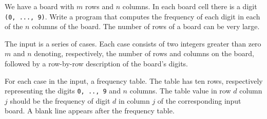 

\Statement

We have a board with $m$ rows and $n$ columns. In each board cell there is a digit {\tt (0, ..., 9)}. Write a program that computes the frequency of each digit in each of the $n$ columns of the board. The number of rows of a board can be very large.


\Input

The input is a series of cases. Each case consists of two integers greater than zero $m$ and $n$ denoting, respectively, the number of rows and columns on the board, followed by a row-by-row description of the board's digits.


\Output

For each case in the input, a frequency table. The table has ten rows, respectively representing the digits {\tt 0, .., 9} and $n$ columns. The table value in row $d$ column $j$ should be the frequency of digit $d$ in column $j$ of the corresponding input board. A blank line appears after the frequency table.

\Sample
